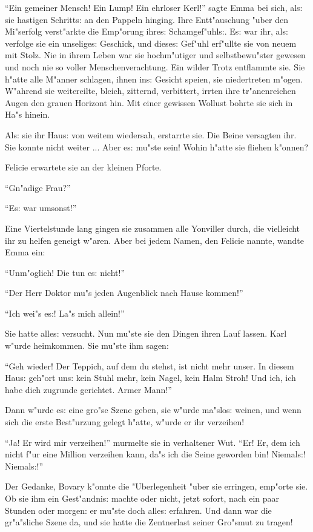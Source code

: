\documentclass[oneside,12pt]{book}
\newcommand{\s}{s:}%
\begin{document}
"`Ein gemeiner Mensch! Ein Lump! Ein ehrloser Kerl!"' sagte Emma
bei sich, al{\s} sie hastigen Schritt{\s} an den Pappeln hinging.
Ihre Entt"auschung "uber den Mi"serfolg verst"arkte die Emp"orung
ihre{\s} Schamgef"uhl{\s}. E{\s} war ihr, al{\s} verfolge sie ein
unselige{\s} Geschick, und diese{\s} Gef"uhl erf"ullte sie von
neuem mit Stolz. Nie in ihrem Leben war sie hochm"utiger und
selbstbewu"ster gewesen und noch nie so voller Menschenverachtung.
Ein wilder Trotz entflammte sie. Sie h"atte alle M"anner schlagen,
ihnen in{\s} Gesicht speien, sie niedertreten m"ogen. W"ahrend sie
weitereilte, bleich, zitternd, verbittert, irrten ihre
tr"anenreichen Augen den grauen Horizont hin. Mit einer gewissen
Wollust bohrte sie sich in Ha"s hinein.

Al{\s} sie ihr Hau{\s} von weitem wiedersah, erstarrte sie. Die
Beine versagten ihr. Sie konnte nicht weiter ... Aber e{\s} mu"ste
sein! Wohin h"atte sie fliehen k"onnen?

Felicie erwartete sie an der kleinen Pforte.

"`Gn"adige Frau?"'

"`E{\s} war umsonst!"'

Eine Viertelstunde lang gingen sie zusammen alle Yonviller durch,
die vielleicht ihr zu helfen geneigt w"aren. Aber bei jedem Namen,
den Felicie nannte, wandte Emma ein:

"`Unm"oglich! Die tun e{\s} nicht!"'

"`Der Herr Doktor mu"s jeden Augenblick nach Hause kommen!"'

"`Ich wei"s e{\s}! La"s mich allein!"'

Sie hatte alle{\s} versucht. Nun mu"ste sie den Dingen ihren Lauf
lassen. Karl w"urde heimkommen. Sie mu"ste ihm sagen:

"`Geh wieder! Der Teppich, auf dem du stehst, ist nicht mehr
unser. In diesem Hau{\s} geh"ort un{\s} kein Stuhl mehr, kein
Nagel, kein Halm Stroh! Und ich, ich habe dich zugrunde gerichtet.
Armer Mann!"'

Dann w"urde e{\s} eine gro"se Szene geben, sie w"urde ma"slo{\s}
weinen, und wenn sich die erste Best"urzung gelegt h"atte, w"urde
er ihr verzeihen!

"`Ja! Er wird mir verzeihen!"' murmelte sie in verhaltener Wut.
"`Er! Er, dem ich nicht f"ur eine Million verzeihen kann, da"s ich
die Seine geworden bin! Niemal{\s}! Niemal{\s}!"'

Der Gedanke, Bovary k"onnte die "Uberlegenheit "uber sie erringen,
emp"orte sie. Ob sie ihm ein Gest"andni{\s} machte oder nicht,
jetzt sofort, nach ein paar Stunden oder morgen: er mu"ste doch
alle{\s} erfahren. Und dann war die gr"a"sliche Szene da, und sie
hatte die Zentnerlast seiner Gro"smut zu tragen!
\end{document}
